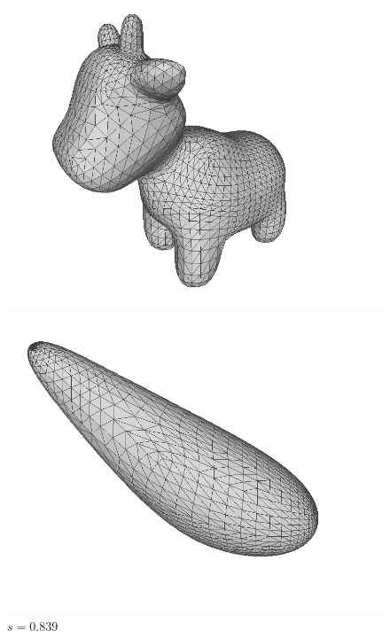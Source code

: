 \documentclass[11pt]{amsart}
\begin{document}
\begin{figure}[H]
\begin{center}
\begin{minipage}[!h]{.27\textwidth}
\centering
\includegraphics[width=\textwidth]{spot}
\caption*{$s = 0.679$}
\end{minipage}%
\hfill
\begin{minipage}[!h]{0.27\textwidth}
\centering
\includegraphics[width=\textwidth]{spotCMCF5}
\caption*{$s = 0.839$} \label{fig:spotcmcf1}
\end{minipage}%
\hfill
\begin{minipage}[!h]{0.27\textwidth}

\end{minipage}
\end{center}
\end{figure}
\end{document}
